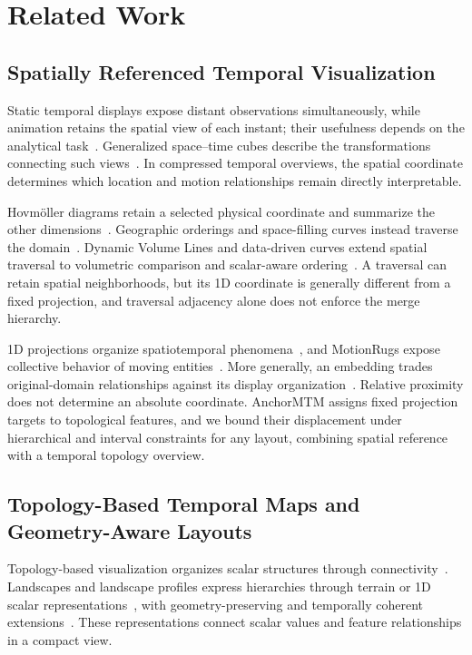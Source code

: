 \documentclass{vgtc}                %
\begin{document}
\section{Related Work}\label{sec:related}
\subsection{Spatially Referenced Temporal Visualization}
Static temporal displays expose distant observations simultaneously, while animation retains the spatial view of each instant; their usefulness depends on the analytical task~\cite{Tversky:2002:Animation,Robertson:2008:Animation}. Generalized space--time cubes describe the transformations connecting such views~\cite{Bach:2017:STC}. In compressed temporal overviews, the spatial coordinate determines which location and motion relationships remain directly interpretable.

Hovm\"oller diagrams retain a selected physical coordinate and summarize the other dimensions~\cite{Hovmoller:1949}. Geographic orderings and space-filling curves instead traverse the domain~\cite{Guo:2006:SpatialOrder,Dafner:2000:CSFC}. Dynamic Volume Lines and data-driven curves extend spatial traversal to volumetric comparison and scalar-aware ordering~\cite{Weissenboeck:2019:DVL,Zhou:2021:DSF}. A traversal can retain spatial neighborhoods, but its 1D coordinate is generally different from a fixed projection, and traversal adjacency alone does not enforce the merge hierarchy.

1D projections organize spatiotemporal phenomena~\cite{Franke:2021:1DP}, and MotionRugs expose collective behavior of moving entities~\cite{Buchmueller:2019:MR}. More generally, an embedding trades original-domain relationships against its display organization~\cite{Nonato:2019:MP}. Relative proximity does not determine an absolute coordinate. AnchorMTM assigns fixed projection targets to topological features, and we bound their displacement under hierarchical and interval constraints for any layout, combining spatial reference with a temporal topology overview.

\subsection{Topology-Based Temporal Maps and Geometry-Aware Layouts}
Topology-based visualization organizes scalar structures through connectivity~\cite{Heine:2016:Survey}. Landscapes and landscape profiles express hierarchies through terrain or 1D scalar representations~\cite{Weber:2007:TL,Oesterling:2013:TLP}, with geometry-preserving and temporally coherent extensions~\cite{Beketayev:2012:GPTL,Herick:2020:TCTL}. These representations connect scalar values and feature relationships in a compact view.
\end{document}
